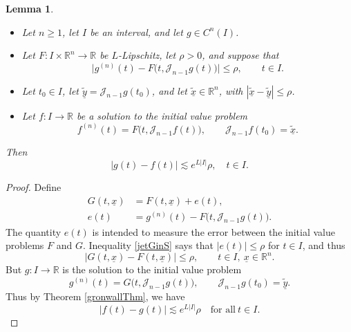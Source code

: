 \documentclass[letterpaper, reqno,11pt]{article}
\numberwithin{equation}{section}
\newcommand{\RR}{\mathbb{R}}
\numberwithin{thm}{section}
\newtheorem{lem}[thm]{Lemma}
\theoremstyle{remark}
\begin{document}
\begin{lem}\label{gronwallCloseToF}
$\phantom{1}$
\begin{itemize}
    \item Let $n\geq 1$, let $I$ be an interval, and let $g\in C^n(I)$.
    \item Let $F\colon I\times\RR^n \to\RR$ be $L$-Lipschitz, let $\rho>0$, and suppose that
    \begin{equation}\label{jetGinS}
    \big|g^{(n)}(t) - F\big(t, \mathcal{J}_{n-1}g(t)\big)\big| \leq \rho,\qquad t\in I.
    \end{equation}

    \item Let $t_0\in I$, let $\tilde{\underline y}=\mathcal{J}_{n-1}g(t_0)$, and let $\tilde{\underline x}\in \RR^n$, with $|\tilde{\underline x}-\tilde{\underline y} |\leq\rho$. 

    \item Let $f\colon I\to\RR$ be a solution to the initial value problem
        \begin{equation}
        f^{(n)}(t) =  F\big(t, \mathcal{J}_{n-1}f(t)\big),\qquad \mathcal{J}_{n-1}f(t_0)=\tilde{\underline x}.
        \end{equation}
\end{itemize}
Then
\begin{equation}\label{gMinusFBound}
|g(t)-f(t)|\lesssim e^{L|I|}\rho,\quad t\in I.
\end{equation}
\end{lem}

%
\begin{proof}
Define 
\begin{equation*}
\begin{split}
G(t, \underline x)&= F(t, \underline x)+e(t),\\
e(t) & = g^{(n)}(t) - F\big(t, \mathcal{J}_{n-1}g(t)\big).
\end{split}
\end{equation*}
The quantity $e(t)$ is intended to measure the error between the initial value problems $F$ and $G$. Inequality \eqref{jetGinS} says that $|e(t)|\leq\rho$ for $t\in I$, and thus
\begin{equation}
\big|G(t, \underline x)-F(t, \underline x)\big|\leq\rho, \qquad t\in I,\ \underline x \in \RR^n.
\end{equation}
But $g\colon I\to\RR$ is the solution to the initial value problem
       \begin{equation}
       g^{(n)}(t) =  G\big(t, \mathcal{J}_{n-1}g(t)\big),\qquad \mathcal{J}_{n-1}g(t_0)=\tilde{\underline y}.
        \end{equation}
Thus by Theorem \ref{gronwallThm}, we have
\begin{equation}
|f(t)-g(t)|\lesssim e^{L|I|}\rho\quad\textrm{for all}\ t\in I.
\end{equation} 
\end{proof}
\end{document}
